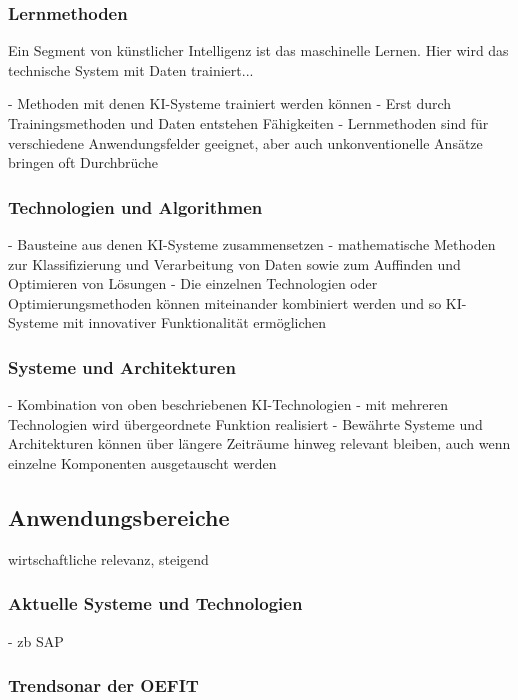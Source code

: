 \documentclass[a4paper,12pt, german]{report}
\begin{document}
\subsubsection{Lernmethoden}

Ein Segment von künstlicher Intelligenz ist das maschinelle Lernen. Hier wird das technische System mit Daten trainiert...

-	Methoden mit denen KI-Systeme trainiert werden können
-	Erst durch Trainingsmethoden und Daten entstehen Fähigkeiten
-	Lernmethoden sind für verschiedene Anwendungsfelder geeignet, aber auch unkonventionelle Ansätze bringen oft Durchbrüche


\subsubsection{Technologien und Algorithmen}

-	Bausteine aus denen KI-Systeme zusammensetzen
-	mathematische Methoden zur Klassifizierung und Verarbeitung von Daten sowie zum Auffinden und Optimieren von Lösungen
-	Die einzelnen Technologien oder Optimierungsmethoden können miteinander kombiniert werden und so KI-Systeme mit innovativer Funktionalität ermöglichen

\subsubsection{Systeme und Architekturen}

-	Kombination von oben beschriebenen KI-Technologien
-	mit mehreren Technologien wird übergeordnete Funktion realisiert
-	Bewährte Systeme und Architekturen können über längere Zeiträume hinweg relevant bleiben, auch wenn einzelne Komponenten ausgetauscht werden

\subsection{Anwendungsbereiche}

wirtschaftliche relevanz, steigend

\subsubsection{Aktuelle Systeme und Technologien}
- zb SAP

\subsubsection{Trendsonar der OEFIT}
\end{document}
